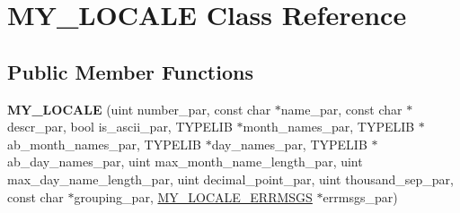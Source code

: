 \hypertarget{classMY__LOCALE}{}\section{M\+Y\+\_\+\+L\+O\+C\+A\+LE Class Reference}
\label{classMY__LOCALE}
\subsection*{Public Member Functions}
\begin{DoxyCompactItemize}
\item 
\mbox{\label{classMY__LOCALE_a9bd29742bad7970d3053e67a9b8ba114}} 
{\bfseries M\+Y\+\_\+\+L\+O\+C\+A\+LE} (uint number\+\_\+par, const char $\ast$name\+\_\+par, const char $\ast$descr\+\_\+par, bool is\+\_\+ascii\+\_\+par, T\+Y\+P\+E\+L\+IB $\ast$month\+\_\+names\+\_\+par, T\+Y\+P\+E\+L\+IB $\ast$ab\+\_\+month\+\_\+names\+\_\+par, T\+Y\+P\+E\+L\+IB $\ast$day\+\_\+names\+\_\+par, T\+Y\+P\+E\+L\+IB $\ast$ab\+\_\+day\+\_\+names\+\_\+par, uint max\+\_\+month\+\_\+name\+\_\+length\+\_\+par, uint max\+\_\+day\+\_\+name\+\_\+length\+\_\+par, uint decimal\+\_\+point\+\_\+par, uint thousand\+\_\+sep\+\_\+par, const char $\ast$grouping\+\_\+par, \mbox{\hyperlink{classMY__LOCALE__ERRMSGS}{M\+Y\+\_\+\+L\+O\+C\+A\+L\+E\+\_\+\+E\+R\+R\+M\+S\+GS}} $\ast$errmsgs\+\_\+par)
\end{DoxyCompactItemize}
